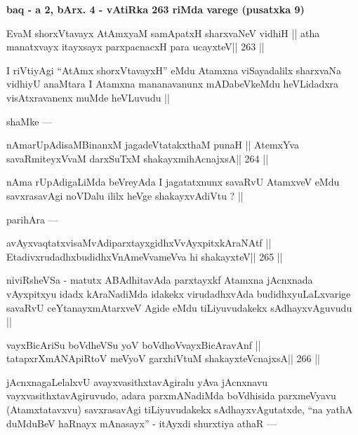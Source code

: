 \begin{center}
{\large\bf baq - a 2, bArx. 4 - vAtiRka 263 riMda varege (pusatxka 9)}
\end{center}

\begin{shl}
EvaM shorxVtavayx AtAmx\s yaM samApatxH sharxvaNeV vidhiH ||
atha manatxvayx itayxsayx parxpacnacxH para ucayxteV\hfill || 263 ||
\end{shl}

\begin{artha}
I riVtiyAgi ``AtAmx shorxVtavayxH'' eMdu Atamxna viSayadalilx sharxvaNa vidhiyU anaMtara I Atamxna mananavanunx mADabeVkeMdu heVLidadxra visAtxravanenx muMde heVLuvudu ||
\end{artha}

\begin{artha}
shaMke ---
\end{artha}

\begin{shl}
nAmarUpAdisaMBinanxM jagadeVtatakxthaM punaH ||
AtemxYva savaRmiteyxVvaM darxSuTxM shakayxmihAcnajxsA\hfill || 264 ||
\end{shl}

\begin{artha}
nAma rUpAdigaLiMda beVreyAda I jagatatxnunx savaRvU AtamxveV eMdu savxrasavAgi noVDalu ililx heVge shakayxvAdiVtu ? ||
\end{artha}

\begin{artha}
parihAra ---
\end{artha}

\begin{shl}
avAyxvaqtatxvisaMvAdiparxtayxgidhxVvAyxpitxkAraNAtf ||
EtadivxrudadhxbudidhxVnAmeVvameVva hi shakayxteV\hfill || 265 ||
\end{shl}

\begin{artha}
niviRsheVSa - matutx ABAdhitavAda parxtayxkf Atamxna jAcnxnada vAyxpitxyu idadx kAraNadiMda idakekx virudadhxvAda budidhxyuLaLxvarige savaRvU ceYtanayxmAtarxveV Agide eMdu tiLiyuvudakekx sAdhayxvAguvudu ||
\end{artha}

\begin{shl}
vayxBicAriSu boVdheVSu yoV boVdhoV\s vayxBicAravAnf ||
tatapxrXmANApiRtoV meVyoV garxhiVtuM shakayxteV\s cnajxsA\hfill || 266 ||
\end{shl}

\begin{artha}
jAcnxnagaLelalxvU avayxvasithxtavAgiralu yAva jAcnxnavu vayxvasithxtavAgiruvudo, adara parxmANadiMda boVdhisida parxmeVyavu (Atamxtatavxvu) savxrasavAgi tiLiyuvudakekx sAdhayxvAgutatxde, ``na yathA duMduBeV haRnayx mAnasayx'' - itAyxdi shurxtiya athaR ---
\end{artha}


